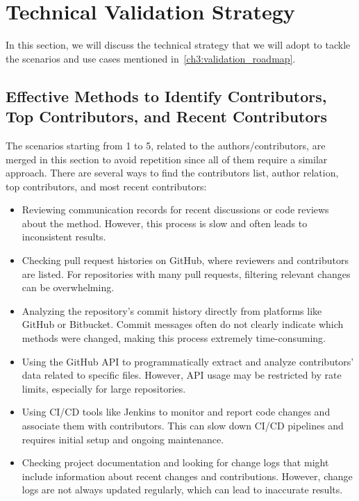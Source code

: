 \section{Technical Validation Strategy}\label{ch3-sec:technical_validation_strategy}

In this section, we will discuss the technical strategy that we will adopt to tackle the scenarios and use cases mentioned in~\autoref{ch3:validation_roadmap}.

\subsection{Effective Methods to Identify Contributors, Top Contributors, and Recent Contributors}

The scenarios starting from 1 to 5, related to the authors/contributors, are merged in this section to avoid repetition since all of them require a similar approach. There are several ways to find the contributors list, author relation, top contributors, and most recent contributors:
\begin{itemize}
    \item Reviewing communication records for recent discussions or code reviews about the method. However, this process is slow and often leads to inconsistent results.
    \item Checking pull request histories on GitHub, where reviewers and contributors are listed. For repositories with many pull requests, filtering relevant changes can be overwhelming.
    \item Analyzing the repository's commit history directly from platforms like GitHub or Bitbucket. Commit messages often do not clearly indicate which methods were changed, making this process extremely time-consuming.
    \item Using the GitHub API to programmatically extract and analyze contributors' data related to specific files. However, API usage may be restricted by rate limits, especially for large repositories.
    \item Using CI/CD tools like Jenkins to monitor and report code changes and associate them with contributors. This can slow down CI/CD pipelines and requires initial setup and ongoing maintenance.
    \item Checking project documentation and looking for change logs that might include information about recent changes and contributions. However, change logs are not always updated regularly, which can lead to inaccurate results.
\end{itemize}

